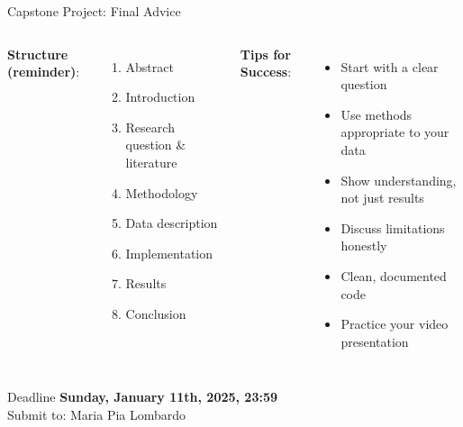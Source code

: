 \documentclass[aspectratio=169,11pt]{beamer}
\begin{document}
\begin{frame}{Capstone Project: Final Advice}
\begin{columns}
\textbf{Structure (reminder)}:
\begin{enumerate}
    \item Abstract
    \item Introduction
    \item Research question \& literature
    \item Methodology
    \item Data description
    \item Implementation
    \item Results
    \item Conclusion
\end{enumerate}

\textbf{Tips for Success}:
\begin{itemize}
    \item Start with a clear question
    \item Use methods appropriate to your data
    \item Show understanding, not just results
    \item Discuss limitations honestly
    \item Clean, documented code
    \item Practice your video presentation
\end{itemize}
\end{columns}

\vspace{0.5em}
\begin{block}{Deadline}
\textbf{Sunday, January 11th, 2025, 23:59}\\
Submit to: Maria Pia Lombardo
\end{block}
\end{frame}
\end{document}
